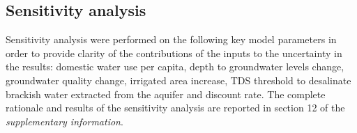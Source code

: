\subsection{Sensitivity analysis}\label{sec:sensitivity}
Sensitivity analysis were performed on the following key model parameters in order to provide clarity of the contributions of the inputs to the uncertainty in the results: domestic water use per capita, depth to groundwater levels change, groundwater quality change, irrigated area increase, TDS threshold to desalinate brackish water extracted from the aquifer and discount rate. The complete rationale and results of the sensitivity analysis are reported in section 12 of the \textit{supplementary information}. %
